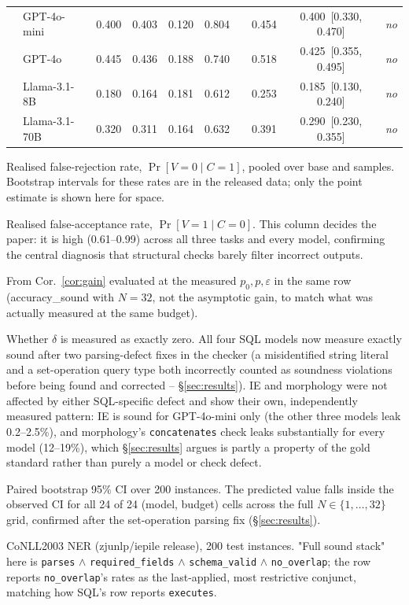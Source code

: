 \documentclass[11pt]{article}
\begin{document}
\begin{table}[t]
\begin{threeparttable}
\begin{tabular}{@{}ll cccc c cc c@{}}
  & GPT-4o-mini   & 0.400 & 0.403 & 0.120 & 0.804 & & 0.454 & 0.400~[0.330, 0.470] & \textit{no} \\
  & GPT-4o        & 0.445 & 0.436 & 0.188 & 0.740 & & 0.518\tnote{n} & 0.425~[0.355, 0.495] & \textit{no} \\
  & Llama-3.1-8B  & 0.180 & 0.164 & 0.181 & 0.612 & & 0.253\tnote{n} & 0.185~[0.130, 0.240] & \textit{no} \\
  & Llama-3.1-70B & 0.320 & 0.311 & 0.164 & 0.632 & & 0.391\tnote{n} & 0.290~[0.230, 0.355] & \textit{no} \\
\bottomrule
\end{tabular}
\begin{tablenotes}[flushleft]\footnotesize
\item[a] Realised false-rejection rate, $\Pr[V{=}0\mid C{=}1]$, pooled over base and samples. Bootstrap intervals for these rates are in the released data; only the point estimate is shown here for space.
\item[b] Realised false-acceptance rate, $\Pr[V{=}1\mid C{=}0]$. This column decides the paper: it is high (0.61--0.99) across all three tasks and every model, confirming the central diagnosis that structural checks barely filter incorrect outputs.
\item[c] From Cor.~\ref{cor:gain} evaluated at the measured $p_0,p,\varepsilon$ in the same row (accuracy\_sound with $N=32$, not the asymptotic gain, to match what was actually measured at the same budget).
\item[d] Whether $\delta$ is measured as exactly zero. All four SQL models now measure exactly sound after two parsing-defect fixes in the checker (a misidentified string literal and a set-operation query type both incorrectly counted as soundness violations before being found and corrected -- \S\ref{sec:results}). IE and morphology were not affected by either SQL-specific defect and show their own, independently measured pattern: IE is sound for GPT-4o-mini only (the other three models leak 0.2--2.5\%), and morphology's \texttt{concatenates} check leaks substantially for every model (12--19\%), which \S\ref{sec:results} argues is partly a property of the gold standard rather than purely a model or check defect.
\item[e] Paired bootstrap 95\% CI over 200 instances. The predicted value falls inside the observed CI for all 24 of 24 (model, budget) cells across the full $N\in\{1,\dots,32\}$ grid, confirmed after the set-operation parsing fix (\S\ref{sec:results}).
\item[g] CoNLL2003 NER (zjunlp/iepile release), 200 test instances. "Full sound stack" here is \texttt{parses} $\wedge$ \texttt{required\_fields} $\wedge$ \texttt{schema\_valid} $\wedge$ \texttt{no\_overlap}; the row reports \texttt{no\_overlap}'s rates as the last-applied, most restrictive conjunct, matching how SQL's row reports \texttt{executes}.

\end{tablenotes}
\end{threeparttable}
\end{table}
\end{document}
